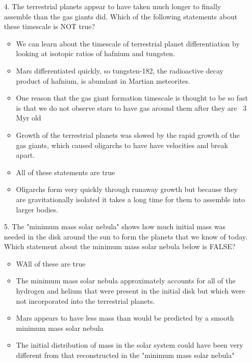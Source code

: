 \begin{enumerate}
    \item[4.] The terrestrial planets appear to have taken much longer to finally assemble than the gas giants did. Which of the following statements about these timescale is NOT true?
    \begin{multicols}{2} \begin{itemize}[label={$\bullet$}]
        \item We can learn about the timescale of terrestrial planet differentiation by looking at isotopic ratios of hafnium and tungsten.
        \item Mars differentiated quickly, so tungsten-182, the radioactive decay product of hafnium, is abundant in Martian meteorites.       
        \item One reason that the gas giant formation timescale is thought to be so fast is that we do not observe stars to have gas around them after they are ~3 Myr old
        \item Growth of the terrestrial planets was slowed by the rapid growth of the gas giants, which caused oligarchs to have have velocities and break apart.
        \item All of these statements are true
        \item Oligarchs form very quickly through runaway growth but because they are gravitationally isolated it takes a long time for them to assemble into larger bodies.
    \end{itemize}\end{multicols}   
    \item[5.] The "minimum mass solar nebula" shows how much initial mass was needed in the disk around the sun to form the planets that we know of today. Which statement about the minimum mass solar nebula below is FALSE?
    \begin{multicols}{2} \begin{itemize}[label={$\bullet$}]
        \item WAll of these are true
        \item The minimum mass solar nebula approximately accounts for all of the hydrogen and helium that were present in the initial disk but which were not incorporated into the terrestrial planets.      
        \item Mars appears to have less mass than would be predicted by a smooth minimum mass solar nebula 
        \item The initial distribution of mass in the solar system could have been very different from that reconstructed in the "minimum mass solar nebula"

\end{itemize}
\end{multicols}
\end{enumerate}

